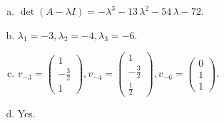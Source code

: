 \begin{questions}
\begin{solution}
\begin{enumerate}[(a)]
\item $\det(A-\lambda I)=-{\lambda}^{3} - 13 \, {\lambda}^{2} - 54 \, {\lambda} - 72$.
\item ${\lambda}_1=-3, {\lambda}_2=-4, {\lambda}_3=-6$.
\item $v_{-3}=\left(\begin{array}{r}
1 \\
-\frac{3}{2} \\
1
\end{array}\right), v_{-4}=\left(\begin{array}{r}
1 \\
-\frac{3}{2} \\
\frac{1}{2}
\end{array}\right), v_{-6}=\left(\begin{array}{r}
0 \\
1 \\
1
\end{array}\right)$.
\item Yes.
\end{enumerate}
\end{solution}

\end{questions}

\newpage


\begin{center}
\end{center}

